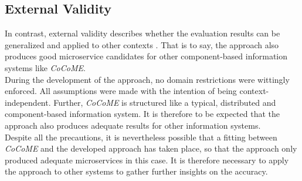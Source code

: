 \subsection{External Validity}
In contrast, external validity describes whether the evaluation results can be generalized and applied to other contexts \cite{Validity}. That is to say, the approach also produces good microservice candidates for other component-based information systems like \textit{CoCoME}. \\
During the development of the approach, no domain restrictions were wittingly enforced. All assumptions were made with the intention of being context-independent. Further, \textit{CoCoME} is structured like a typical, distributed and component-based information system. It is therefore to be expected that the approach also produces adequate results for other information systems. \\
Despite all the precautions, it is nevertheless possible that a fitting between \textit{CoCoME} and the developed approach has taken place, so that the approach only produced adequate microservices in this case. It is therefore necessary to apply the approach to other systems to gather further insights on the accuracy.










